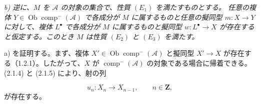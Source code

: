 \noindent\textit{b) 逆に、$M$ を $\mathcal A$ の対象の集合で、性質 $(E_1)$ を満たすものとする。
任意の複体 $Y\in\operatorname{Ob}\operatorname{comp}^{-}(\mathcal A)$ で各成分が $M$ に属するものと任意の擬同型
$m\colon X\longrightarrow Y$ に対して、複体 $L^\bullet$ で各成分が $M$ に属するものと擬同型
$w\colon L^\bullet\longrightarrow X$ が存在すると仮定する。このとき $M$ は性質
$(E_2)$ と $(E_3)$ を満たす。}

a) を証明する。まず、複体
$X'\in\operatorname{Ob}\operatorname{comp}^{-}(\mathcal A)$ と擬同型
$X'\longrightarrow X$ が存在する（1.2.1）。したがって、$X$ が
$\operatorname{comp}^{-}(\mathcal A)$ の対象である場合に帰着できる。
(2.1.4) と (2.1.5) により、射の列

\[
u_n\colon X_n\longrightarrow X_{n-1},
\qquad n\in\mathbf Z,
\]
が存在する。
\endgroup
